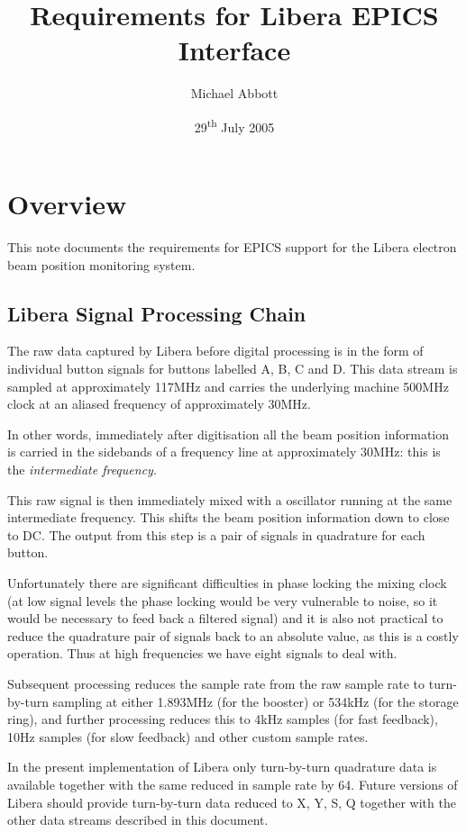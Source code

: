 \documentclass[
    a4paper,
    fleqn
]{article}
\begin{document}
\title{Requirements for Libera EPICS Interface}
\author{Michael Abbott}
\date{29\textsuperscript{th} July 2005}
\maketitle

\section{Overview}

This note documents the requirements for EPICS support for the Libera
electron beam position monitoring system.  

\subsection{Libera Signal Processing Chain}

The raw data captured by Libera before digital processing is in the
form of individual button signals for buttons labelled A, B, C and D.
This data stream is sampled at approximately 117MHz and carries the
underlying machine 500MHz clock at an aliased frequency of
approximately 30MHz.

In other words, immediately after digitisation all the beam position
information is carried in the sidebands of a frequency line at
approximately 30MHz: this is the \emph{intermediate frequency}.

This raw signal is then immediately mixed with a oscillator running at
the same intermediate frequency.  This shifts the beam position
information down to close to DC.  The output from this step is a pair
of signals in quadrature for each button.

Unfortunately there are significant difficulties in phase locking the
mixing clock (at low signal levels the phase locking would be very
vulnerable to noise, so it would be necessary to feed back a filtered
signal) and it is also not practical to reduce the quadrature pair of
signals back to an absolute value, as this is a costly operation.
Thus at high frequencies we have eight signals to deal with.

Subsequent processing reduces the sample rate from the raw sample rate
to turn-by-turn sampling at either 1.893MHz (for the booster) or
534kHz (for the storage ring), and further processing reduces this to
4kHz samples (for fast feedback), 10Hz samples (for slow feedback) and
other custom sample rates.

In the present implementation of Libera only turn-by-turn quadrature
data is available together with the same reduced in sample rate by 64.
Future versions of Libera should provide turn-by-turn data reduced to
X, Y, S, Q together with the other data streams described in this
document.
\end{document}
